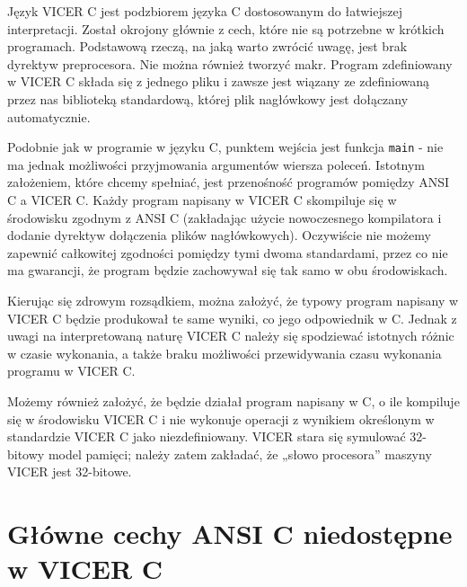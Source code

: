\documentclass[a4paper,twoside,openright,11pt]{report}
\begin{document}
\par Język VICER C jest podzbiorem języka C dostosowanym do łatwiejszej interpretacji. Został okrojony głównie z cech, które nie są potrzebne w krótkich programach. Podstawową rzeczą, na jaką warto zwrócić uwagę, jest brak dyrektyw preprocesora. Nie można również tworzyć makr. Program zdefiniowany w VICER C składa się z jednego pliku i zawsze jest wiązany ze zdefiniowaną przez nas biblioteką standardową, której plik nagłówkowy jest dołączany automatycznie. 
\par Podobnie jak w programie w języku C, punktem wejścia jest funkcja \texttt{main} - nie ma jednak możliwości przyjmowania argumentów wiersza poleceń. Istotnym założeniem, które chcemy spełniać, jest przenośność programów pomiędzy ANSI C a VICER C. Każdy program napisany w VICER C skompiluje się w środowisku zgodnym z ANSI C (zakładając użycie nowoczesnego kompilatora i dodanie dyrektyw dołączenia plików nagłówkowych). Oczywiście nie możemy zapewnić całkowitej zgodności pomiędzy tymi dwoma standardami, przez co nie ma gwarancji, że program będzie zachowywał się tak samo w obu środowiskach. \par Kierując się zdrowym rozsądkiem, można założyć, że typowy program napisany w VICER C będzie produkował te same wyniki, co jego odpowiednik w C. Jednak z uwagi na interpretowaną naturę VICER C należy się spodziewać istotnych różnic w czasie wykonania, a także braku możliwości przewidywania czasu wykonania programu w VICER C. 
\par Możemy również założyć, że będzie działał program napisany w C, o ile kompiluje się w środowisku VICER C i nie wykonuje operacji z wynikiem określonym w standardzie VICER C jako niezdefiniowany. VICER stara się symulować 32-bitowy model pamięci; należy zatem zakładać, że „słowo procesora” maszyny VICER jest 32-bitowe. 

  \section {Główne cechy ANSI C niedostępne w VICER C}
\end{document}

